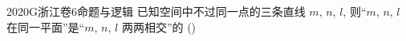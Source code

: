 
\begin{problem}{2020}{G}{浙江卷}{6}{命题与逻辑}
已知空间中不过同一点的三条直线 $ m $, $ n $, $ l $, 则“$ m $, $ n $, $ l $ 在同一平面”是“$ m $, $ n $, $ l $ 两两相交”的 (\hspace{1cm})

\begin{choices}
\end{choices}
\end{problem}

\begin{answer}

\end{answer}

\begin{solutions}

\end{solutions}